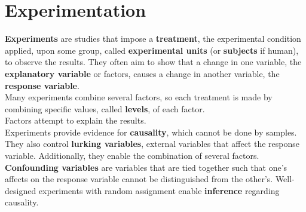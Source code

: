\documentclass[../AP_Statistics.tex]{subfiles}
\begin{document}
	\chapter{Experimentation}
		\textbf{Experiments} are studies that impose a \textbf{treatment}, the experimental condition applied, upon some group, called \textbf{experimental units} (or \textbf{subjects} if human), to observe the results. They often aim to show that a change in one variable, the \textbf{explanatory variable} or factors, causes a change in another variable, the \textbf{response variable}. \\
		Many experiments combine several factors, so each treatment is made by combining specific values, called \textbf{levels}, of each factor. \\
		Factors attempt to explain the results. \\
		Experiments provide evidence for \textbf{causality}, which cannot be done by samples. They also control \textbf{lurking variables}, external variables that affect the response variable. Additionally, they enable the combination of several factors. \\
		\textbf{Confounding variables} are variables that are tied together such that one's affects on the response variable cannot be distinguished from the other's.
		Well-designed experiments with random assignment enable \textbf{inference} regarding causality.
\end{document}
